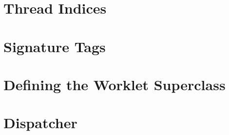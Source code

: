 \section{Thread Indices}
\label{sec:ThreadIndices}




\section{Signature Tags}
\label{sec:NewWorkletTypes:SignatureTags}

\section{Defining the Worklet Superclass}

\section{Dispatcher}
\label{sec:NewWorkletTypes:Dispatcher}


